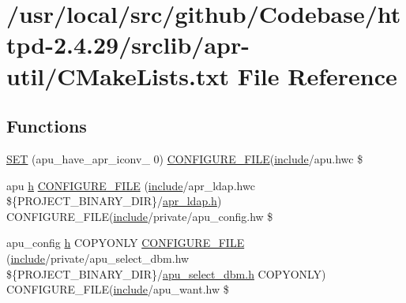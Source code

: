 \hypertarget{srclib_2apr-util_2CMakeLists_8txt}{}\section{/usr/local/src/github/\+Codebase/httpd-\/2.4.29/srclib/apr-\/util/\+C\+Make\+Lists.txt File Reference}
\label{srclib_2apr-util_2CMakeLists_8txt}
\subsection*{Functions}
\begin{DoxyCompactItemize}
\item 
\hyperlink{srclib_2apr-util_2CMakeLists_8txt_a9d3f681941fe4095644800df06e3d9d4}{S\+ET} (apu\+\_\+have\+\_\+apr\+\_\+iconv\+\_ 0) \hyperlink{srclib_2apr-util_2CMakeLists_8txt_a351aa0c0f74152efe07c1934d10697d6}{C\+O\+N\+F\+I\+G\+U\+R\+E\+\_\+\+F\+I\+LE}(\hyperlink{pcregrep_8txt_a5f3af678bb8252fcdc8e42a9cbf654a8}{include}/apu.\+hwc \$
\item 
apu \hyperlink{pcregrep_8txt_a373589baca2cb79ec87f46d6599640b9}{h} \hyperlink{srclib_2apr-util_2CMakeLists_8txt_af31a1d2767abc279fe60988586bfbe89}{C\+O\+N\+F\+I\+G\+U\+R\+E\+\_\+\+F\+I\+LE} (\hyperlink{pcregrep_8txt_a5f3af678bb8252fcdc8e42a9cbf654a8}{include}/apr\+\_\+ldap.\+hwc \$\{P\+R\+O\+J\+E\+C\+T\+\_\+\+B\+I\+N\+A\+R\+Y\+\_\+\+D\+IR\}/\hyperlink{pcregrep_8txt_a373589baca2cb79ec87f46d6599640b9}{apr\+\_\+ldap.\+h}) C\+O\+N\+F\+I\+G\+U\+R\+E\+\_\+\+F\+I\+LE(\hyperlink{pcregrep_8txt_a5f3af678bb8252fcdc8e42a9cbf654a8}{include}/private/apu\+\_\+config.\+hw \$
\item 
apu\+\_\+config \hyperlink{pcregrep_8txt_a373589baca2cb79ec87f46d6599640b9}{h} C\+O\+P\+Y\+O\+N\+LY \hyperlink{srclib_2apr-util_2CMakeLists_8txt_a351aa0c0f74152efe07c1934d10697d6}{C\+O\+N\+F\+I\+G\+U\+R\+E\+\_\+\+F\+I\+LE} (\hyperlink{pcregrep_8txt_a5f3af678bb8252fcdc8e42a9cbf654a8}{include}/private/apu\+\_\+select\+\_\+dbm.\+hw \$\{P\+R\+O\+J\+E\+C\+T\+\_\+\+B\+I\+N\+A\+R\+Y\+\_\+\+D\+IR\}/\hyperlink{pcregrep_8txt_a373589baca2cb79ec87f46d6599640b9}{apu\+\_\+select\+\_\+dbm.\+h} C\+O\+P\+Y\+O\+N\+LY) C\+O\+N\+F\+I\+G\+U\+R\+E\+\_\+\+F\+I\+LE(\hyperlink{pcregrep_8txt_a5f3af678bb8252fcdc8e42a9cbf654a8}{include}/apu\+\_\+want.\+hw \$
\item 

\end{DoxyCompactItemize}
